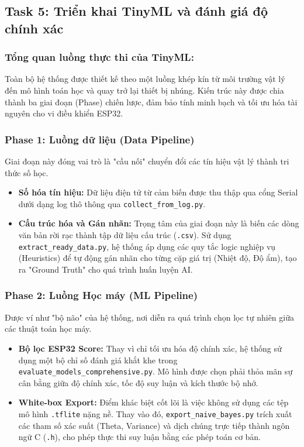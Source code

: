 \subsection{Task 5: Triển khai TinyML và đánh giá độ chính xác}
\subsubsection{Tổng quan luồng thực thi của TinyML:}
Toàn bộ hệ thống được thiết kế theo một luồng khép kín từ môi trường vật lý đến mô hình toán học và quay trở lại thiết bị nhúng. Kiến trúc này được chia thành ba giai đoạn (Phase) chiến lược, đảm bảo tính minh bạch và tối ưu hóa tài nguyên cho vi điều khiển ESP32.

\subsubsection*{Phase 1: Luồng dữ liệu (Data Pipeline)}
Giai đoạn này đóng vai trò là "cầu nối" chuyển đổi các tín hiệu vật lý thành tri thức số học.
\begin{itemize}
    \item \textbf{Số hóa tín hiệu:} Dữ liệu điện tử từ cảm biến được thu thập qua cổng Serial dưới dạng log thô thông qua \texttt{collect\_from\_log.py}.
    \item \textbf{Cấu trúc hóa và Gán nhãn:} Trọng tâm của giai đoạn này là biến các dòng văn bản rời rạc thành tập dữ liệu cấu trúc (\texttt{.csv}). Sử dụng \texttt{extract\_ready\_data.py}, hệ thống áp dụng các quy tắc logic nghiệp vụ (Heuristics) để tự động gán nhãn cho từng cặp giá trị (Nhiệt độ, Độ ẩm), tạo ra "Ground Truth" cho quá trình huấn luyện AI.
\end{itemize}

\subsubsection*{Phase 2: Luồng Học máy (ML Pipeline)}
Được ví như "bộ não" của hệ thống, nơi diễn ra quá trình chọn lọc tự nhiên giữa các thuật toán học máy.
\begin{itemize}
    \item \textbf{Bộ lọc ESP32 Score:} Thay vì chỉ tối ưu hóa độ chính xác, hệ thống sử dụng một bộ chỉ số đánh giá khắt khe trong \texttt{evaluate\_models\_comprehensive.py}. Mô hình được chọn phải thỏa mãn sự cân bằng giữa độ chính xác, tốc độ suy luận và kích thước bộ nhớ.
    \item \textbf{White-box Export:} Điểm khác biệt cốt lõi là việc không sử dụng các tệp mô hình \texttt{.tflite} nặng nề. Thay vào đó, \texttt{export\_naive\_bayes.py} trích xuất các tham số xác suất (Theta, Variance) và dịch chúng trực tiếp thành ngôn ngữ C (\texttt{.h}), cho phép thực thi suy luận bằng các phép toán cơ bản.
\end{itemize}

